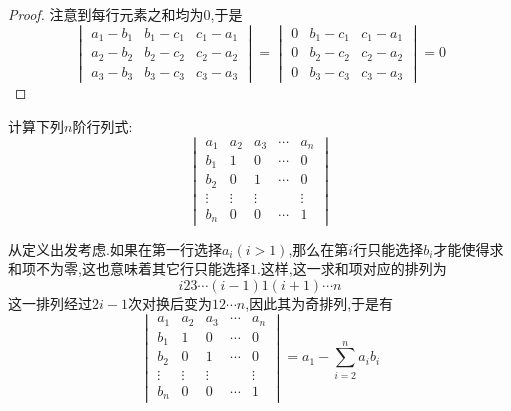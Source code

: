 \documentclass{ctexart}
\begin{document}
\begin{proof}
    注意到每行元素之和均为$0$,于是
    \[\begin{vmatrix}
        a_1-b_1&b_1-c_1&c_1-a_1\\
        a_2-b_2&b_2-c_2&c_2-a_2\\
        a_3-b_3&b_3-c_3&c_3-a_3
    \end{vmatrix}=\begin{vmatrix}
        0&b_1-c_1&c_1-a_1\\
        0&b_2-c_2&c_2-a_2\\
        0&b_3-c_3&c_3-a_3
    \end{vmatrix}=0\]
\end{proof}
\begin{homework}[4(1)]
    计算下列$n$阶行列式:
    \[\begin{vmatrix}
        a_1&a_2&a_3&\cdots&a_n\\
        b_1&1&0&\cdots&0\\
        b_2&0&1&\cdots&0\\
        \vdots&\vdots&\vdots& &\vdots\\
        b_n&0&0&\cdots&1
    \end{vmatrix}\]
\end{homework}
\begin{solution}
    从定义出发考虑.如果在第一行选择$a_i(i>1)$,那么在第$i$行只能选择$b_i$才能使得求和项不为零,这也意味着其它行只能选择$1$.这样,这一求和项对应的排列为
    \[i23\cdots(i-1)1(i+1)\cdots n\]
    这一排列经过$2i-1$次对换后变为$12\cdots n$,因此其为奇排列,于是有
    \[\begin{vmatrix}
        a_1&a_2&a_3&\cdots&a_n\\
        b_1&1&0&\cdots&0\\
        b_2&0&1&\cdots&0\\
        \vdots&\vdots&\vdots& &\vdots\\
        b_n&0&0&\cdots&1
    \end{vmatrix}=a_1-\sum_{i=2}^{n}a_ib_i\]
\end{solution}
\end{document}
